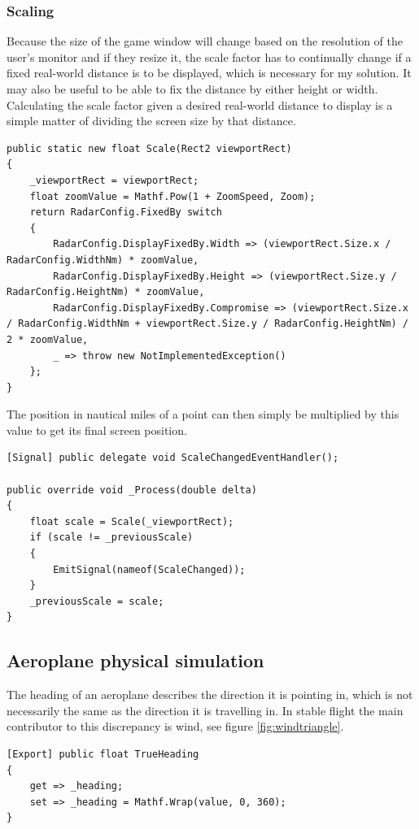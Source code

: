 \documentclass{article}
\begin{document}
\subsubsection{Scaling}
Because the size of the game window will change based on the resolution of the user's monitor and if they resize it, the scale factor has to continually change if a fixed real-world distance is to be displayed, which is necessary for my solution.
It may also be useful to be able to fix the distance by either height or width.
Calculating the scale factor given a desired real-world distance to display is a simple matter of dividing the screen size by that distance.
\lstset{style=csharp}
\begin{lstlisting}[caption=Calculating the scale]
public static new float Scale(Rect2 viewportRect)
{
    _viewportRect = viewportRect;
    float zoomValue = Mathf.Pow(1 + ZoomSpeed, Zoom);
    return RadarConfig.FixedBy switch
    {
        RadarConfig.DisplayFixedBy.Width => (viewportRect.Size.x / RadarConfig.WidthNm) * zoomValue,
        RadarConfig.DisplayFixedBy.Height => (viewportRect.Size.y / RadarConfig.HeightNm) * zoomValue,
        RadarConfig.DisplayFixedBy.Compromise => (viewportRect.Size.x / RadarConfig.WidthNm + viewportRect.Size.y / RadarConfig.HeightNm) / 2 * zoomValue,
        _ => throw new NotImplementedException()
    };
}
\end{lstlisting}
The position in nautical miles of a point can then simply be multiplied by this value to get its final screen position.
\begin{lstlisting}[caption=Notifying other modules of a change in scale]
[Signal] public delegate void ScaleChangedEventHandler();

public override void _Process(double delta)
{
    float scale = Scale(_viewportRect);
    if (scale != _previousScale)
    {
        EmitSignal(nameof(ScaleChanged));
    }
    _previousScale = scale;
}
\end{lstlisting}


\subsection{Aeroplane physical simulation}
The heading of an aeroplane describes the direction it is pointing in, which is not necessarily the same as the direction it is travelling in.
In stable flight the main contributor to this discrepancy is wind, see figure \ref{fig:windtriangle}.

\lstset{style=csharp}
\begin{lstlisting}[caption=Wrapping true heading value]
[Export] public float TrueHeading
{
    get => _heading;
    set => _heading = Mathf.Wrap(value, 0, 360);
}
\end{lstlisting}
\end{document}
